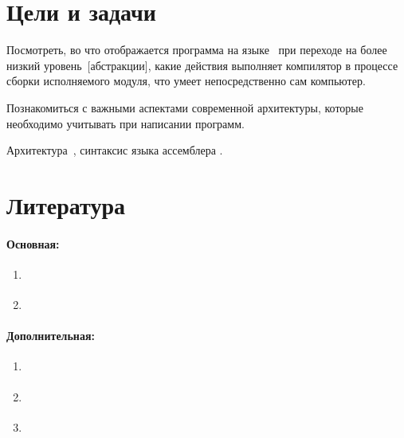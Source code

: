 
\section{Цели и задачи}
Посмотреть, во что отображается программа на языке~ при переходе на более низкий уровень~[абстракции], какие действия выполняет компилятор в процессе сборки исполняемого модуля, что умеет непосредственно сам компьютер.

Познакомиться с важными аспектами современной архитектуры, которые необходимо учитывать при написании программ.

Архитектура \,, синтаксис языка ассемблера .



\section{Литература}

\paragraph{Основная:}
\begin{enumerate}
  \item \cite{Harris:2015:ru}
  \item \cite{Bryant:2016:en}
\end{enumerate}



\paragraph{Дополнительная:}
\begin{enumerate}[resume]
  \item \cite{Tanenbaum:2013:ru}
  \item \cite{Vorozhcov:2008:ru}
  \item \cite{Pacheco:2011:en}
\end{enumerate}
\nocite{WikiBookAsm:ru, Zubkov:2000:ru}



